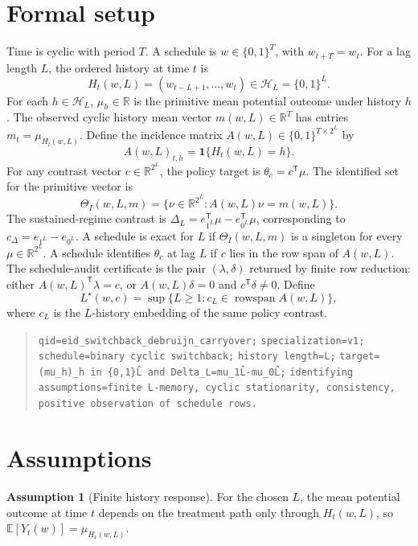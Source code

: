 \documentclass[11pt]{article}
\newcommand{\E}{\mathbb{E}}
\newcommand{\one}{\mathbf{1}}
\newcommand{\transpose}{\mathsf{T}}
\newcommand{\calH}{\mathcal{H}}
\newcommand{\R}{\mathbb{R}}
\theoremstyle{definition}
\newtheorem{assumption}{Assumption}
\theoremstyle{plain}
\theoremstyle{remark}
\begin{document}
\section{Formal setup}
Time is cyclic with period \(T\). A schedule is \(w\in\{0,1\}^T\), with \(w_{t+T}=w_t\). For a lag length \(L\), the ordered history at time \(t\) is
\[
H_t(w,L)=(w_{t-L+1},\ldots,w_t)\in\calH_L=\{0,1\}^L .
\]
For each \(h\in\calH_L\), \(\mu_h\in\R\) is the primitive mean potential outcome under history \(h\). The observed cyclic history mean vector \(m(w,L)\in\R^T\) has entries \(m_t=\mu_{H_t(w,L)}\). Define the incidence matrix \(A(w,L)\in\{0,1\}^{T\times 2^L}\) by
\[
A(w,L)_{t,h}=\one\{H_t(w,L)=h\}.
\]
For any contrast vector \(c\in\R^{2^L}\), the policy target is \(\theta_c=c^\transpose\mu\). The identified set for the primitive vector is
\[
\Theta_I(w,L,m)=\{\nu\in\R^{2^L}:A(w,L)\nu=m(w,L)\}.
\]
The sustained-regime contrast is \(\Delta_L=e_{1^L}^{\transpose}\mu-e_{0^L}^{\transpose}\mu\), corresponding to \(c_\Delta=e_{1^L}-e_{0^L}\). A schedule is exact for \(L\) if \(\Theta_I(w,L,m)\) is a singleton for every \(\mu\in\R^{2^L}\). A schedule identifies \(\theta_c\) at lag \(L\) if \(c\) lies in the row span of \(A(w,L)\). The schedule-audit certificate is the pair \((\lambda,\delta)\) returned by finite row reduction: either \(A(w,L)^\transpose\lambda=c\), or \(A(w,L)\delta=0\) and \(c^\transpose\delta\neq0\). Define
\[
L^\star(w,c)=\sup\{L\geq1:c_L\in\operatorname{rowspan}A(w,L)\},
\]
where \(c_L\) is the \(L\)-history embedding of the same policy contrast.

\begin{quote}
\texttt{qid=eid\_switchback\_debruijn\_carryover;} \texttt{specialization=v1;} \texttt{schedule=binary cyclic switchback;} \texttt{history length=L;} \texttt{target=(mu\_h)\_{h in \{0,1\}\^L} and Delta\_L=mu\_{1\^L}-mu\_{0\^L};} \texttt{identifying assumptions=finite L-memory, cyclic stationarity, consistency, positive observation of schedule rows.}
\end{quote}

\section{Assumptions}
\begin{assumption}[Finite history response]\label{ass:finite-history}
For the chosen \(L\), the mean potential outcome at time \(t\) depends on the treatment path only through \(H_t(w,L)\), so \(\E[Y_t(w)]=\mu_{H_t(w,L)}\).
\end{assumption}
\end{document}
